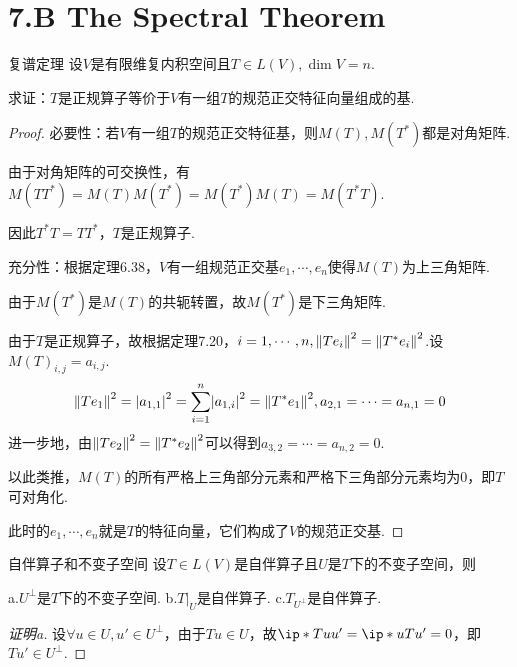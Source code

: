 \section{7.B The Spectral Theorem}

\begin{theorem}[7.24]\label{thm 7.24} 复谱定理 \:
    设\(V\)是有限维复内积空间且\(T \in L(V),\dim V=n\).

    求证：\(T\)是正规算子等价于\(V\)有一组\(T\)的规范正交特征向量组成的基.
\end{theorem}

\begin{proof}
    必要性：若\(V\)有一组\(T\)的规范正交特征基，则\(M(T),M(T^*)\)都是对角矩阵.

    由于对角矩阵的可交换性，有\(M(TT^*)=M(T)M(T^*)=M(T^*)M(T)=M(T^*T)\).
    
    因此\(T^*T=TT^*\)，\(T\)是正规算子.
    
    充分性：根据定理6.38，\(V\)有一组规范正交基\(e_1,\cdots,e_n\)使得\(M(T)\)为上三角矩阵.
    
    由于\(M(T^*)\)是\(M(T)\)的共轭转置，故\(M(T^*)\)是下三角矩阵.
    
    由于\(T\)是正规算子，故根据定理7.20，\(i=1,\cdots,n,\norm*{Te_i}^2=\norm*{T^*e_i}^2\).设\(M(T)_{i,j}=a_{i,j}\).
    \begin{align*}
        \norm*{Te_1}^2=\abs*{a_{1,1}}^2=\sum_{i=1}^n \abs*{a_{1,i}}^2=\norm*{T^*e_1}^2,a_{2,1}=\cdots=a_{n,1}=0
    \end{align*}
    进一步地，由\(\norm*{Te_2}^2=\norm*{T^*e_2}^2\)可以得到\(a_{3,2}=\cdots=a_{n,2}=0\).
    
    以此类推，\(M(T)\)的所有严格上三角部分元素和严格下三角部分元素均为\(0\)，即\(T\)可对角化.
    
    此时的\(e_1,\cdots,e_n\)就是\(T\)的特征向量，它们构成了\(V\)的规范正交基.
\end{proof}

\begin{lemma}[7.28]\label{lem 7.28} 自伴算子和不变子空间 \:
    设\(T \in L(V)\)是自伴算子且\(U\)是\(T\)下的不变子空间，则

    a.\(U^\bot\)是\(T\)下的不变子空间. \quad
    b.\(T|_U\)是自伴算子. \quad
    c.\(T_{U^\bot}\)是自伴算子.
\end{lemma}

\begin{proof}[证明a]
    设\(\forall u \in U,u' \in U^\bot\)，由于\(Tu \in U\)，故\(\ip*{Tu}{u'}=\ip*{u}{Tu'}=0\)，即\(Tu' \in U^\bot\).
\end{proof}

